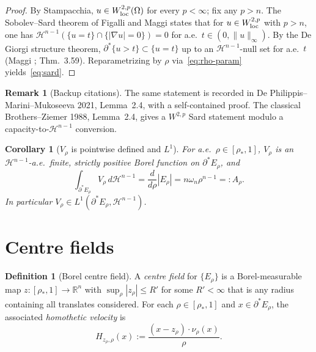 \documentclass[11pt]{article}
\newtheorem{corollary}[theorem]{Corollary}
\theoremstyle{definition}
\newtheorem{definition}[theorem]{Definition}
\newtheorem{remark}[theorem]{Remark}
\newcommand{\R}{\mathbb{R}}
\newcommand{\Om}{\Omega}
\newcommand{\rstar}{\rho_{*}}
\begin{document}
\begin{proof}
By Stampacchia, $u\in W^{2,p}_{\rm loc}(\Om)$ for every $p<\infty$; fix any
$p>n$. The Sobolev--Sard theorem of Figalli and Maggi
\cite[Appendix~A, Thm.~A.1]{FigalliMaggi2011} states that for $u\in
W^{2,p}_{\rm loc}$ with $p>n$, one has
$\mathcal H^{n-1}(\{u=t\}\cap\{|\nabla u|=0\})=0$ for a.e.\
$t\in(0,\|u\|_\infty)$. By the De Giorgi structure theorem,
$\partial^*\{u>t\}\subset\{u=t\}$ up to an $\mathcal H^{n-1}$-null set for
a.e.\ $t$ (Maggi \cite[\S 15]{Maggi2012}; \cite{AFP2000} Thm.~3.59).
Reparametrizing by $\rho$ via~\eqref{eq:rho-param} yields~\eqref{eq:sard}.
\end{proof}

\begin{remark}[Backup citations]\label{rem:backup}
The same statement is recorded in De Philippis--Marini--Mukoseeva 2021,
Lemma~2.4, with a self-contained proof. The classical Brothers--Ziemer
1988, Lemma~2.4, gives a $W^{2,p}$ Sard statement modulo a
capacity-to-$\mathcal H^{n-1}$ conversion.
\end{remark}

\begin{corollary}[$V_\rho$ is pointwise defined and $L^1$]\label{cor:V-L1}
For a.e.\ $\rho\in[\rstar,1]$, $V_\rho$ is an $\mathcal H^{n-1}$-a.e.\
finite, strictly positive Borel function on $\partial^*E_\rho$, and
\begin{equation}\label{eq:V-flux}
   \int_{\partial^*E_\rho}V_\rho\,d\mathcal H^{n-1}
   =\frac{d}{d\rho}|E_\rho|=n\omega_n\rho^{n-1}=:A_\rho.
\end{equation}
In particular $V_\rho\in L^1(\partial^*E_\rho,\mathcal H^{n-1})$.
\end{corollary}

\section{Centre fields}\label{sec:center}

\begin{definition}[Borel centre field]\label{def:center}
A \emph{centre field} for $\{E_\rho\}$ is a Borel-measurable map
$z:[\rstar,1]\to\R^n$ with $\sup_\rho|z_\rho|\le R'$ for some
$R'<\infty$ that is any radius containing all translates considered.
For each $\rho\in[\rstar,1]$ and $x\in\partial^*E_\rho$,
the associated \emph{homothetic velocity} is
\begin{equation}\label{eq:H-def}
   H_{z_\rho,\rho}(x):=\frac{(x-z_\rho)\cdot\nu_\rho(x)}{\rho}.
\end{equation}
\end{definition}
\end{document}
